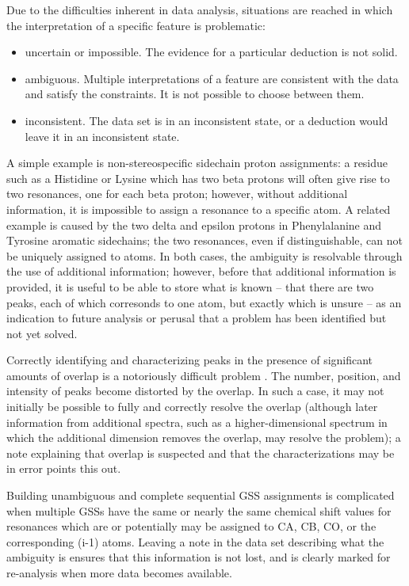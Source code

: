 Due to the difficulties inherent in data analysis, situations are reached
in which the interpretation of a specific feature is problematic:
\begin{itemize}
  \item uncertain or impossible.  The evidence for a particular deduction 
    is not solid.
  \item ambiguous.  Multiple interpretations of a feature are consistent
    with the data and satisfy the constraints.  It is not possible to choose
    between them.
  \item inconsistent.  The data set is in an inconsistent state, or a 
    deduction would leave it in an inconsistent state.
\end{itemize}
A simple example is non-stereospecific sidechain proton assignments: 
a residue such as a Histidine or Lysine which has two beta protons will 
often give rise to two resonances, one for each beta proton; however, 
without additional information, it is impossible to assign a resonance to
a specific atom.  A related example is caused by the two delta and epsilon
protons in Phenylalanine and Tyrosine aromatic sidechains; the two resonances,
even if distinguishable, can not be uniquely assigned to atoms.  In both
cases, the ambiguity is resolvable through the use of additional information;
however, before that additional information is provided, it is useful to be
able to store what is known -- that there are two peaks, each of which 
corresonds to one atom, but exactly which is unsure -- as an indication to
future analysis or perusal that a problem has been identified but not yet
solved.

Correctly identifying and characterizing peaks in the presence of significant
amounts of overlap is a notoriously difficult problem \cite{guerry2011automated}.
The number, position, and intensity of peaks become distorted by the overlap.
In such a case, it may not initially be possible to fully and correctly
resolve the overlap (although later information from additional spectra, such
as a higher-dimensional spectrum in which the additional dimension removes
the overlap, may resolve the problem); a note explaining that overlap is
suspected and that the characterizations may be in error points this out.

Building unambiguous and complete sequential GSS assignments is complicated 
when multiple GSSs have the same or nearly the same chemical shift values
for resonances which are or potentially may be assigned to CA, CB, CO, or the
corresponding (i-1) atoms.  Leaving a note in the data set describing what
the ambiguity is ensures that this information is not lost, and is clearly
marked for re-analysis when more data becomes available.


